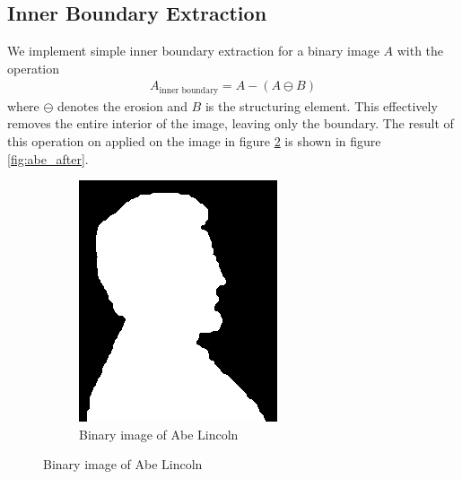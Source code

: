 \documentclass[]{article}
\begin{document}
\subsection{Inner Boundary Extraction}
We implement simple inner boundary extraction for a binary image $A$ with the operation
\begin{equation}\begin{aligned}
A_{\text{inner boundary}} = A - (A \ominus B)
\end{aligned}\end{equation}
where $\ominus$ denotes the erosion and $B$ is the structuring element. This effectively removes the entire interior of the image, leaving only the boundary. The result of this operation on applied on the image in figure \ref{fig:abe_before} is shown in figure \ref{fig:abe_after}.
\begin{figure}[H]
    \centering
    \begin{subfigure}{0.5\textwidth}
        \centering
        \includegraphics[width=\textwidth]{img/before/lincoln}
        \caption{Binary image of Abe Lincoln}
        \label{fig:abe_before}

\end{subfigure}
\end{figure}
\end{document}
